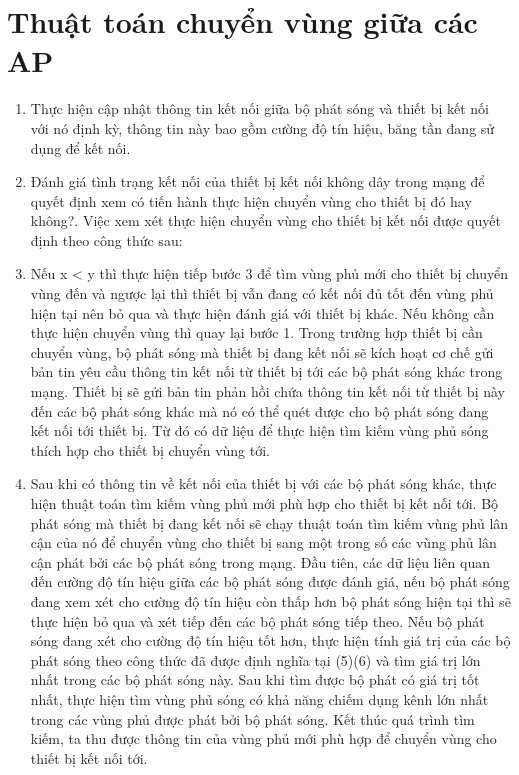 \section{Thuật toán chuyển vùng giữa các AP}
\begin{enumerate}
\item Thực hiện cập nhật thông tin kết nối giữa bộ phát sóng và thiết bị kết nối với nó định kỳ, thông tin này bao gồm cường độ tín hiệu, băng tần đang sử dụng để kết nối.
\item Đánh giá tình trạng kết nối của thiết bị kết nối không dây trong mạng để quyết định xem có tiến hành thực hiện chuyển vùng cho thiết bị đó hay không?. Việc xem xét thực hiện chuyển vùng cho thiết bị kết nối được quyết định theo công thức sau:
\item Nếu x < y thì thực hiện tiếp bước 3 để tìm vùng phủ mới cho thiết bị chuyển vùng đến và ngược lại thì thiết bị vẫn đang có kết nối đủ tốt đến vùng phủ hiện tại nên bỏ qua và thực hiện đánh giá với thiết bị khác. Nếu không cần thực hiện chuyển vùng thì quay lại bước 1. Trong trường hợp thiết bị cần chuyển vùng, bộ phát sóng mà thiết bị đang kết nối sẽ kích hoạt cơ chế gửi bản tin yêu cầu thông tin kết nối từ thiết bị tới các bộ phát sóng khác trong mạng. Thiết bị sẽ gửi bản tin phản hồi chứa thông tin kết nối từ thiết bị này đến các bộ phát sóng khác mà nó có thể quét được cho bộ phát sóng đang kết nối tới thiết bị. Từ đó có dữ liệu để thực hiện tìm kiếm vùng phủ sóng thích hợp cho thiết bị chuyển vùng tới.
\item Sau khi có thông tin về kết nối của thiết bị với các bộ phát sóng khác, thực hiện thuật toán tìm kiếm vùng phủ mới phù hợp cho thiết bị kết nối tới. Bộ phát sóng mà thiết bị đang kết nối sẽ chạy thuật toán tìm kiếm vùng phủ lân cận của nó để chuyển vùng cho thiết bị sang một trong số các vùng phủ lân cận phát bởi các bộ phát sóng trong mạng. Đầu tiên, các dữ liệu liên quan đến cường độ tín hiệu giữa các bộ phát sóng được đánh giá, nếu bộ phát sóng đang xem xét cho cường độ tín hiệu còn thấp hơn bộ phát sóng hiện tại thì sẽ thực hiện bỏ qua và xét tiếp đến các bộ phát sóng tiếp theo. Nếu bộ phát sóng đang xét cho cường độ tín hiệu tốt hơn, thực hiện tính giá trị  của các bộ phát sóng theo công thức đã được định nghĩa tại (5)(6) và tìm giá trị  lớn nhất trong các bộ phát sóng này. Sau khi tìm được bộ phát có giá trị  tốt nhất, thực hiện tìm vùng phủ sóng có khả năng chiếm dụng kênh lớn nhất trong các vùng phủ được phát bởi bộ phát sóng. Kết thúc quá trình tìm kiếm, ta thu được thông tin của vùng phủ mới phù hợp để chuyển vùng cho thiết bị kết nối tới.

\end{enumerate}
